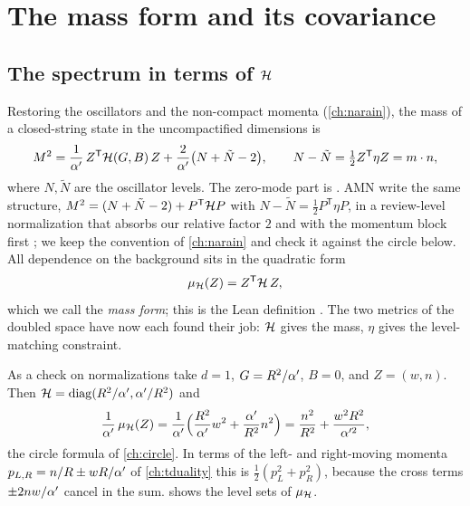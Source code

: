 \section{The mass form and its covariance}\label{sec:genmetric:massform}

\subsection{The spectrum in terms of \texorpdfstring{$\mathcal{H}$}{H}}

Restoring the oscillators and the non-compact momenta (\cref{ch:narain}), the mass of a
closed-string state in the uncompactified dimensions is
\begin{equation}\label{eq:genmetric:mass}
 M^2=\frac1{\alpha'}\,Z^{\mathsf T}\mathcal{H}(G,B)\,Z+\frac2{\alpha'}\big(N+\tilde N-2\big),\qquad
 N-\tilde N=\tfrac12Z^{\mathsf T}\eta Z=m\cdot n,
\end{equation}
where $N,\tilde N$ are the oscillator levels. The zero-mode part is
. AMN write the same structure,
$M^2=(N+\tilde N-2)+P^{\mathsf T}\mathcal{H} P$ with $N-\tilde N=\frac12P^{\mathsf T}\eta P$, in a
review-level normalization that absorbs our relative factor $2$ and with the momentum
block first ; we keep the convention of
\cref{ch:narain} and check it against the circle below. All dependence on the background
sits in the quadratic form
\begin{equation}\label{eq:genmetric:massform}
 \mu_{\mathcal{H}}(Z)=Z^{\mathsf T}\mathcal{H}\,Z ,
\end{equation}
which we call the \emph{mass form}; this is the Lean definition
. The two metrics of the doubled space have now each found their job:
$\mathcal{H}$ gives the mass, $\eta$ gives the level-matching constraint.

As a check on normalizations take $d=1$, $G=R^2/\alpha'$, $B=0$, and $Z=(w,n)$. Then
$\mathcal{H}=\operatorname{diag}(R^2/\alpha',\alpha'/R^2)$ and
\begin{equation}\label{eq:genmetric:circle}
 \frac1{\alpha'}\,\mu_{\mathcal{H}}(Z)=\frac1{\alpha'}\Big(\frac{R^2}{\alpha'}w^2+\frac{\alpha'}{R^2}n^2\Big)
 =\frac{n^2}{R^2}+\frac{w^2R^2}{\alpha'^2},
\end{equation}
the circle formula of \cref{ch:circle}. In terms of the left- and right-moving momenta
$p_{L,R}=n/R\pm wR/\alpha'$ of \cref{ch:tduality} this is $\tfrac12(p_L^2+p_R^2)$, because the
cross terms $\pm2nw/\alpha'$ cancel in the sum.  shows the level
sets of $\mu_{\mathcal{H}}$.

